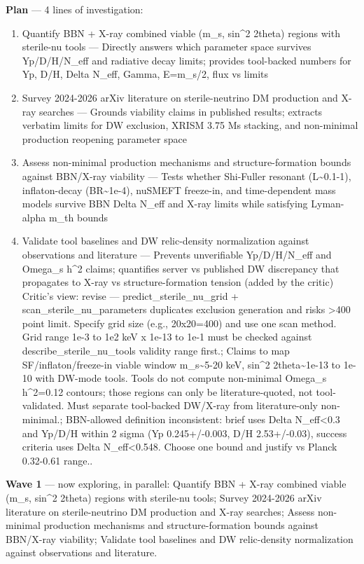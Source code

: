 \documentclass[11pt,a4paper]{article}
\begin{document}
\textbf{Plan} --- 4 lines of investigation:

\begin{enumerate}
  \item Quantify BBN + X-ray combined viable (m\_s, sin\textasciicircum{}2 2theta) regions with sterile-nu tools --- Directly answers which parameter space survives Yp/D/H/N\_eff and radiative decay limits; provides tool-backed numbers for Yp, D/H, Delta N\_eff, Gamma, E=m\_s/2, flux vs limits
  \item Survey 2024-2026 arXiv literature on sterile-neutrino DM production and X-ray searches --- Grounds viability claims in published results; extracts verbatim limits for DW exclusion, XRISM 3.75 Ms stacking, and non-minimal production reopening parameter space
  \item Assess non-minimal production mechanisms and structure-formation bounds against BBN/X-ray viability --- Tests whether Shi-Fuller resonant (L\textasciitilde{}0.1-1), inflaton-decay (BR\textasciitilde{}1e-4), nuSMEFT freeze-in, and time-dependent mass models survive BBN Delta N\_eff and X-ray limits while satisfying Lyman-alpha m\_th bounds
  \item Validate tool baselines and DW relic-density normalization against observations and literature --- Prevents unverifiable Yp/D/H/N\_eff and Omega\_s h\textasciicircum{}2 claims; quantifies server vs published DW discrepancy that propagates to X-ray vs structure-formation tension (added by the critic)
Critic's view: revise --- predict\_sterile\_nu\_grid + scan\_sterile\_nu\_parameters duplicates exclusion generation and risks \textgreater{}400 point limit. Specify grid size (e.g., 20x20=400) and use one scan method. Grid range 1e-3 to 1e2 keV x 1e-13 to 1e-1 must be checked against describe\_sterile\_nu\_tools validity range first.; Claims to map SF/inflaton/freeze-in viable window m\_s\textasciitilde{}5-20 keV, sin\textasciicircum{}2 2theta\textasciitilde{}1e-13 to 1e-10 with DW-mode tools. Tools do not compute non-minimal Omega\_s h\textasciicircum{}2=0.12 contours; those regions can only be literature-quoted, not tool-validated. Must separate tool-backed DW/X-ray from literature-only non-minimal.; BBN-allowed definition inconsistent: brief uses Delta N\_eff\textless{}0.3 and Yp/D/H within 2 sigma (Yp 0.245+/-0.003, D/H 2.53+/-0.03), success criteria uses Delta N\_eff\textless{}0.548. Choose one bound and justify vs Planck 0.32-0.61 range..

\end{enumerate}
\textbf{Wave 1} --- now exploring, in parallel: Quantify BBN + X-ray combined viable (m\_s, sin\textasciicircum{}2 2theta) regions with sterile-nu tools; Survey 2024-2026 arXiv literature on sterile-neutrino DM production and X-ray searches; Assess non-minimal production mechanisms and structure-formation bounds against BBN/X-ray viability; Validate tool baselines and DW relic-density normalization against observations and literature.
\end{document}
